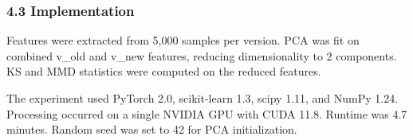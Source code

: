 \subsubsection{4.3 Implementation}

Features were extracted from 5,000 samples per version. PCA was fit on combined v_old and v_new features, reducing dimensionality to 2 components. KS and MMD statistics were computed on the reduced features.

The experiment used PyTorch 2.0, scikit-learn 1.3, scipy 1.11, and NumPy 1.24. Processing occurred on a single NVIDIA GPU with CUDA 11.8. Runtime was 4.7 minutes. Random seed was set to 42 for PCA initialization.
